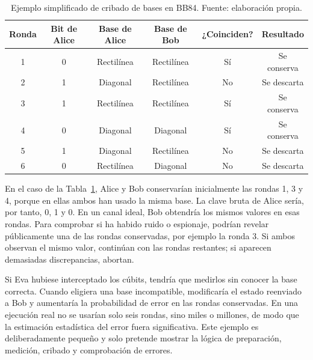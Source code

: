 \begin{table}[h]
    \centering
    \small
    \begin{tabular}{c c c c c c}
        \hline\hline
        Ronda & Bit de Alice & Base de Alice & Base de Bob & ¿Coinciden? & Resultado \\
        \hline
        1 & 0 & Rectilínea & Rectilínea & Sí & Se conserva \\
        2 & 1 & Diagonal & Rectilínea & No & Se descarta \\
        3 & 1 & Rectilínea & Rectilínea & Sí & Se conserva \\
        4 & 0 & Diagonal & Diagonal & Sí & Se conserva \\
        5 & 1 & Diagonal & Rectilínea & No & Se descarta \\
        6 & 0 & Rectilínea & Diagonal & No & Se descarta \\
        \hline
    \end{tabular}
    \caption[Ejemplo de cribado en BB84]{Ejemplo simplificado de cribado de bases en BB84. Fuente: elaboración propia.}
    \label{tab:bb84_ejemplo}
\end{table}

En el caso de la Tabla~\ref{tab:bb84_ejemplo}, Alice y Bob conservarían inicialmente las rondas 1, 3 y 4, porque en ellas ambos han usado la misma base. La clave bruta de Alice sería, por tanto, 0, 1 y 0. En un canal ideal, Bob obtendría los mismos valores en esas rondas. Para comprobar si ha habido ruido o espionaje, podrían revelar públicamente una de las rondas conservadas, por ejemplo la ronda 3. Si ambos observan el mismo valor, continúan con las rondas restantes; si aparecen demasiadas discrepancias, abortan.

Si Eva hubiese interceptado los cúbits, tendría que medirlos sin conocer la base correcta. Cuando eligiera una base incompatible, modificaría el estado reenviado a Bob y aumentaría la probabilidad de error en las rondas conservadas. En una ejecución real no se usarían solo seis rondas, sino miles o millones, de modo que la estimación estadística del error fuera significativa. Este ejemplo es deliberadamente pequeño y solo pretende mostrar la lógica de preparación, medición, cribado y comprobación de errores.
